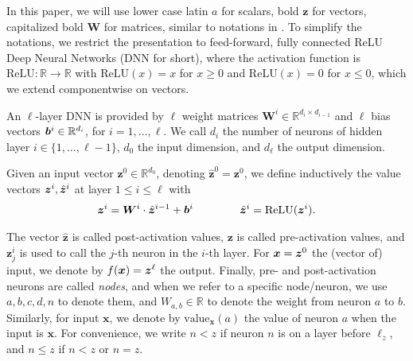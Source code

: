 \documentclass[letterpaper]{article} %
\newcommand{\val}{{\textrm{value}}}
\newcommand{\ReLU}{\mathrm{ReLU}}
\begin{document}
	In this paper, we will use lower case latin $a$ for scalars, bold $\boldsymbol{z}$ for vectors, 
	capitalized bold $\boldsymbol{W}$ for matrices, similar to notations in \cite{crown}.
	To simplify the notations, we restrict the presentation to feed-forward, 
	fully connected ReLU Deep Neural Networks (DNN for short), where the activation function is $\ReLU : \mathbb{R} \rightarrow \mathbb{R}$ with
	$\ReLU(x)=x$ for $x \geq 0$ and $\ReLU(x)=0$ for $x \leq 0$, which we extend componentwise on vectors.
	
	
	
	
	An $\ell$-layer DNN is provided by $\ell$ weight matrices 
	$\boldsymbol{W}^i \in \mathbb{R}^{d_i\times d_{i-1}}$
	and $\ell$ bias vectors ${\bm{b}}^i \in \mathbb{R}^{d_i}$, for $i=1, \ldots, \ell$.
	We call $d_i$ the number of neurons of hidden layer $i \in \{1, \ldots, \ell-1\}$,
	$d_0$ the input dimension, and $d_\ell$ the output dimension.
	
	Given an input vector $\boldsymbol{z}^0 \in \mathbb{R}^{d_0}$, 
	denoting $\hat{\boldsymbol{z}}^{0}={\boldsymbol{z}}^0$, we define inductively the value vectors $\boldsymbol{z}^i,\hat{{\bm{z}}}^i$ at layer $1 \leq i \leq \ell$ with
	\begin{align*}
		\boldsymbol{z}^{i} = \boldsymbol{W}^i\cdot \hat{\boldsymbol{z}}^{i-1}+ \vb^i \qquad \, \qquad
		\hat{\boldsymbol{z}}^{i} = \ReLU({\boldsymbol{z}}^i).
	\end{align*} 
	
	The vector $\hat{\boldsymbol{z}}$ is called post-activation values, 
	$\boldsymbol{z}$ is called pre-activation values, 
	and $\boldsymbol{z}^{i}_j$ is used to call the $j$-th neuron in the $i$-th layer. 
	For $\boldsymbol{x}={\bm{z}}^0$ the (vector of) input, we denote by $f(\boldsymbol{x})={\bm{z}}^\ell$ the output. Finally, pre- and post-activation neurons are called \emph{nodes}, and when we refer to a specific node/neuron, we use $a,b,c,d,n$ to denote them, and $W_{a,b} \in \mathbb{R}$ to denote the weight from neuron $a$ to $b$. Similarly, for input $\boldsymbol{x}$, we denote by $\val_{\boldsymbol{x}}(a)$ the value of neuron $a$ when the input is $\boldsymbol{x}$.	For convenience, we write $n < z$ if neuron $n$ is on a layer before $\ell_z$, and $n \leq z$ if $n< z$ or $n=z$.
	
\end{document}
